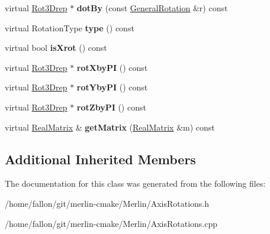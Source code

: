 \begin{DoxyCompactItemize}
virtual \hyperlink{classRot3Drep}{Rot3\+Drep} $\ast$ {\bfseries dot\+By} (const \hyperlink{classGeneralRotation}{General\+Rotation} \&r) const
\item 
\mbox{\label{classRotationX_accd56ab188b397a488ec42c85a8960fa}} 
virtual Rotation\+Type {\bfseries type} () const
\item 
\mbox{\label{classRotationX_a0917d59d2051dfa1fc74565474b8b8cf}} 
virtual bool {\bfseries is\+Xrot} () const
\item 
\mbox{\label{classRotationX_a0da4b1704b5ce84b1c21b7f6c70fd695}} 
virtual \hyperlink{classRot3Drep}{Rot3\+Drep} $\ast$ {\bfseries rot\+Xby\+PI} () const
\item 
\mbox{\label{classRotationX_a056ef56c6808e9f9bff48fc4014bc8da}} 
virtual \hyperlink{classRot3Drep}{Rot3\+Drep} $\ast$ {\bfseries rot\+Yby\+PI} () const
\item 
\mbox{\label{classRotationX_ad229625714fbfbe20e38385343da184e}} 
virtual \hyperlink{classRot3Drep}{Rot3\+Drep} $\ast$ {\bfseries rot\+Zby\+PI} () const
\item 
\mbox{\label{classRotationX_aee0561d51b08fea32e3c4019f2cc6368}} 
virtual \hyperlink{classTLAS_1_1Matrix}{Real\+Matrix} \& {\bfseries get\+Matrix} (\hyperlink{classTLAS_1_1Matrix}{Real\+Matrix} \&m) const
\end{DoxyCompactItemize}
\subsection*{Additional Inherited Members}


The documentation for this class was generated from the following files\+:\begin{DoxyCompactItemize}
\item 
/home/fallon/git/merlin-\/cmake/\+Merlin/Axis\+Rotations.\+h\item 
/home/fallon/git/merlin-\/cmake/\+Merlin/Axis\+Rotations.\+cpp\end{DoxyCompactItemize}
